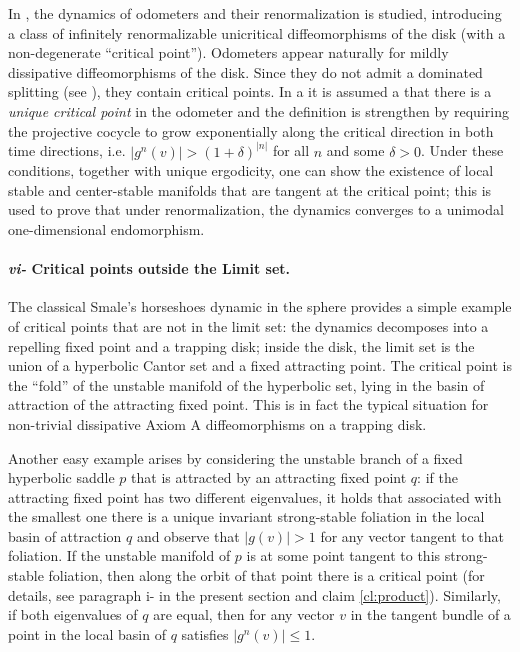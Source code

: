 \documentclass[a4paper,11pt]{article}
\theoremstyle{definition}
\def\de{\delta}
\begin{document}
In \cite{CLPY}, the dynamics of odometers and their renormalization is studied, introducing a class of infinitely renormalizable unicritical diffeomorphisms of the disk (with a non-degenerate ``critical point”). Odometers appear naturally for mildly dissipative diffeomorphisms of the disk. Since they do not admit a dominated splitting (see \cite{CPT}), they contain critical points. In \cite{CLPY} a it is assumed a that there is a {\it unique critical point} in the odometer and  the definition is strengthen by requiring the projective cocycle to grow exponentially along the critical direction in both time directions, i.e. $|g^n(v)| > (1+\de)^{|n|}$ for all $n$ and some $\de>0$. Under these conditions, together with unique ergodicity, one can show the existence of local stable and center-stable manifolds that are tangent at the critical point; this is used to prove that under renormalization, the dynamics converges to a unimodal one-dimensional endomorphism.


\paragraph{{\em vi-} Critical points outside the Limit set.} The classical Smale's horseshoes dynamic in the sphere provides a simple example of critical points that  are not in the limit set: the dynamics decomposes into a repelling fixed point and a trapping disk; inside the disk, the limit set is the union of a hyperbolic Cantor set and a fixed attracting point. The critical point is the ``fold'' of the unstable manifold of the hyperbolic set, lying in the basin of attraction of the attracting fixed point. This is in fact the typical situation for non-trivial dissipative Axiom A diffeomorphisms on a trapping disk. 

Another easy example arises by considering the unstable branch of a fixed hyperbolic saddle $p$ that is attracted by an attracting fixed point $q$: if the attracting fixed point has two different eigenvalues, it holds that associated with the smallest one there is a unique invariant strong-stable foliation in the local basin of attraction $q$ and observe that $|g(v)|>1$ for any vector tangent to that foliation. If the unstable manifold of $p$ is at some point tangent to this strong-stable foliation, then along the orbit of that point there is a critical point (for details, see paragraph i- in the present section and claim \ref{cl:product}). Similarly, if both eigenvalues of $q$ are equal, then for any vector $v$ in the tangent bundle of a point in the local basin of $q$ satisfies $|g^n(v)|\leq 1.$
\end{document}
